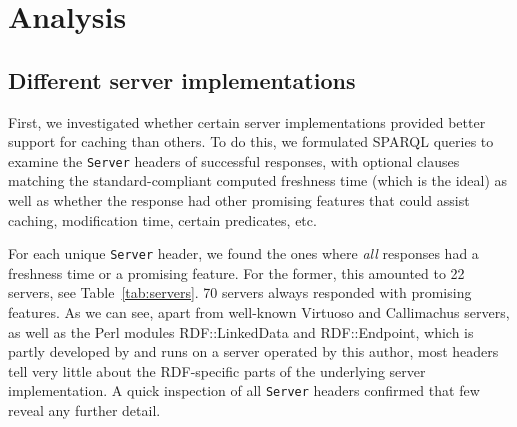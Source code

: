 \documentclass{llncs}
\newcommand{\httph}[1]{\texttt{#1}}
\begin{document}
\section{Analysis}

\subsection{Different server implementations}

First, we investigated whether certain server implementations provided better support
for caching than others. To do this, we formulated SPARQL queries to
examine the \httph{Server} headers of successful responses, with
optional clauses matching the standard-compliant computed freshness
time (which is the ideal) as well as whether the response had other
promising features that could assist caching, modification time,
certain predicates, etc.

For each unique \httph{Server} header, we found the ones where
\emph{all} responses had a freshness time or a promising feature. For
the former, this amounted to 22 servers, see 
Table~\ref{tab:servers}. 70 servers always responded with promising
features. As we can see, apart from well-known Virtuoso and
Callimachus servers, as well as the Perl modules RDF::LinkedData and
RDF::Endpoint, which is partly developed by and runs on a server
operated by this author, most headers tell very little about the
RDF-specific parts of the underlying server implementation. A quick
inspection of all \httph{Server} headers confirmed that few reveal any
further detail.
\end{document}
